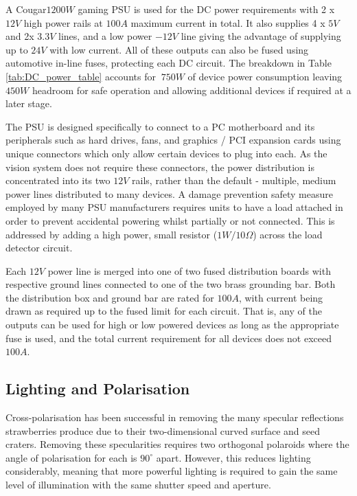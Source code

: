 \documentclass[fleqn,twoside,12pt]{report}
\begin{document}
A Cougar\texttrademark $1200W$ gaming PSU is used for the DC power requirements with 2 x $12V$ high power rails at $100A$ maximum current in total. It also supplies 4 x $5V$ and 2x $3.3V$ lines, and a low power $-12V$ line giving the advantage of supplying up to $24V$ with low current. All of these outputs can also be fused using automotive in-line fuses, protecting each DC circuit. The breakdown in Table \ref{tab:DC_power_table} accounts for $~750W$ of device power consumption leaving $450W$ headroom for safe operation and allowing additional devices if required at a later stage.


The PSU is designed specifically to connect to a PC motherboard and its peripherals such as hard drives, fans, and graphics / PCI expansion cards using unique connectors which only allow certain devices to plug into each. As the vision system does not require these connectors, the power distribution is concentrated into its two $12V$ rails, rather than the default - multiple, medium power lines distributed to many devices. A damage prevention safety measure employed by many PSU manufacturers requires units to have a load attached in order to prevent accidental powering whilst partially or not connected. This is addressed by adding a high power, small resistor ($1W/10\Omega$) across the load detector circuit.  


Each $12V$ power line is merged into one of two fused distribution boards with respective ground lines connected to one of the two brass grounding bar. Both the distribution box and ground bar are rated for $100A$, with current being drawn as required up to the fused limit for each circuit. That is, any of the outputs can be used for high or low powered devices as long as the appropriate fuse is used, and the total current requirement for all devices does not exceed $100A$. 



\subsection{Lighting and Polarisation}


Cross-polarisation has been successful in removing the many specular reflections strawberries produce due to their two-dimensional curved surface and seed craters. Removing these specularities requires two orthogonal polaroids where the angle of polarisation for each is $90^{\circ}$ apart. However, this reduces lighting considerably, meaning that more powerful lighting is required to gain the same level of illumination with the same shutter speed and aperture.
\end{document}
